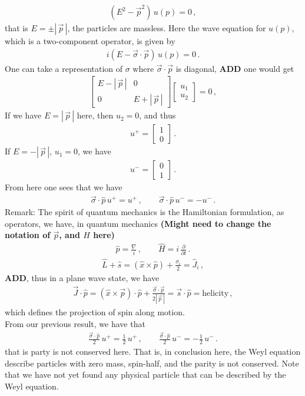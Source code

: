 \documentclass[11pt, onesided]{book}
\theoremstyle{break}
\theoremstyle{break}
\newcommand{\pd}{\partial}
\newcommand{\bmat}[1]{\begin{bmatrix} #1 \end{bmatrix}}
\newcommand{\remark}{\color{blue}Remark: \color{black}}
\begin{document}
\begin{align*}
(E^2 - \vec{p}^2) \, u(p) = 0\,,
\end{align*}
that is $E = \pm |\,\vec{p}\,|$, the particles are massless. Here the wave equation for $u(p)$, which is a two-component operator, is given by
\begin{align*}
i(E - \vec{\sigma} \cdot \vec{p})\, u(p) = 0\,.
\end{align*}
One can take a representation of $\sigma$ where $\vec{\sigma}\cdot \vec{p}$ is diagonal, \textbf{ADD} one would get
\begin{align*}
\bmat{E - |\, \vec{p}\,| & 0 \\
0 & E + |\,\vec{p}\,|} \bmat{u_1\\ u_2} = 0\,,
\end{align*}
If we have $E = |\,\vec{p}\,|$ here, then $u_2 = 0$, and thus
\begin{align*}
u^+ = \bmat{1 \\ 0}\,.
\end{align*}
If $E = -|\,\vec{p}\,|$, $u_1 = 0$, we have
\begin{align*}
u^- = \bmat{0 \\ 1}\,.
\end{align*}
From here one sees that we have
\begin{align*}
\vec{\sigma} \cdot \hat{p} \, u^+ = u^+\,,\qquad
\vec{\sigma} \cdot \hat{p} \, u^- = -u^-\,.
\end{align*}
\remark The spirit of quantum mechanics is the Hamiltonian formulation, as operators, we have, in quantum mechanics \textbf{(Might need to change the notation of $\vec{p}$, and $H$ here)}
\begin{align*}
\hat{p} = \frac{\nabla}{i}\,,\qquad \hat{H} = i \,\frac{\pd}{\pd t}\,.
\end{align*}
\begin{align*}
\hat{L} + \hat{s} = (\hat{x} \times \hat{p}) + \frac{\sigma_i}{2} = \hat{J}_i\,,
\end{align*}
\textbf{ADD}, thus in a plane wave state, we have
\begin{align*}
\vec{J}\cdot \hat{p} = (\hat{x}\times \vec{p})\cdot \hat{p} + \frac{\vec{\sigma}\cdot \vec{p}}{2|\,\vec{p}\,|} = \vec{s}\cdot \hat{p} = \text{helicity}\,,
\end{align*}
which defines the projection of spin along motion. \\

From our previous result, we have that
\begin{align*}
\frac{\vec{\sigma}\cdot \hat{p}}{2} \, u^+ = \frac{1}{2}\, u^+\,,\qquad
\frac{\vec{\sigma}\cdot \hat{p}}{2} \, u^- = -\frac{1}{2}\, u^-\,.
\end{align*}
that is party is not conserved here. That is, in conclusion here, the Weyl equation describe particles with zero mass, spin-half, and the parity is not conserved. Note that we have not yet found any physical particle that can be described by the Weyl equation. \\
\end{document}
